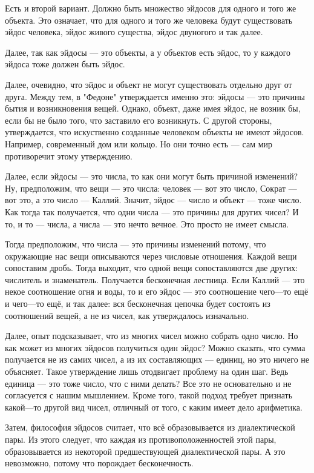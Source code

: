 \documentclass[oneside, 17pt, dvipsnames]{extbook}
\begin{document}
Есть и второй вариант. Должно быть множество эйдосов для одного и того же объекта. Это означает, что для одного и того же человека будут существовать эйдос человека, эйдос живого существа, эйдос двуногого и так далее.

Далее, так как эйдосы --- это объекты, а у объектов есть эйдос, то у каждого эйдоса тоже должен быть эйдос.

Далее, очевидно, что эйдос и объект не могут существовать отдельно друг от друга. Между тем, в "Федоне" утверждается именно это: эйдосы --- это причины бытия и возникновения вещей. Однако, объект, даже имея эйдос, не возник бы, если бы не было того, что заставило его возникнуть. С другой стороны, утверждается, что искуственно созданные человеком объекты не имеют эйдосов. Например, современный дом или кольцо. Но они точно есть --- сам мир противоречит этому утверждению.

Далее, если эйдосы --- это числа, то как они могут быть причиной изменений? Ну, предположим, что вещи --- это числа: человек --- вот это число, Сократ --- вот это, а это число --- Каллий. Значит, эйдос --- число и объект --- тоже число. Как тогда так получается, что одни числа --- это причины для других чисел? И то, и то --- числа, а числа --- это нечто вечное. Это просто не имеет смысла.

Тогда предположим, что числа --- это причины изменений потому, что окружающие нас вещи описываются через числовые отношения. Каждой вещи сопоставим дробь. Тогда выходит, что одной вещи сопоставляются две других: числитель и знаменатель. Получается бесконечная лестница. Если Каллий --- это некое соотношение огня и воды, то и его эйдос --- это соотношение чего---то ещё и чего---то ещё, и так далее: вся бесконечная цепочка будет состоять из соотношений вещей, а не из чисел, как утверждалось изначально.

Далее, опыт подсказывает, что из многих чисел можно собрать одно число. Но как может из многих эйдосов получиться один эйдос? Можно сказать, что сумма получается не из самих чисел, а из их составляющих --- единиц, но это ничего не объясняет. Такое утверждение лишь отодвигает проблему на один шаг. Ведь единица --- это тоже число, что с ними делать? Все это не основательно и не согласуется с нашим мышлением. Кроме того, такой подход требует признать какой---то другой вид чисел, отличный от того, с каким имеет дело арифметика.

Затем, философия эйдосов считает, что всё образовывается из диалектической пары. Из этого следует, что каждая из противоположенностей этой пары, образовывается из некоторой предшествующей диалектической пары. А это невозможно, потому что порождает бесконечность.
\end{document}
